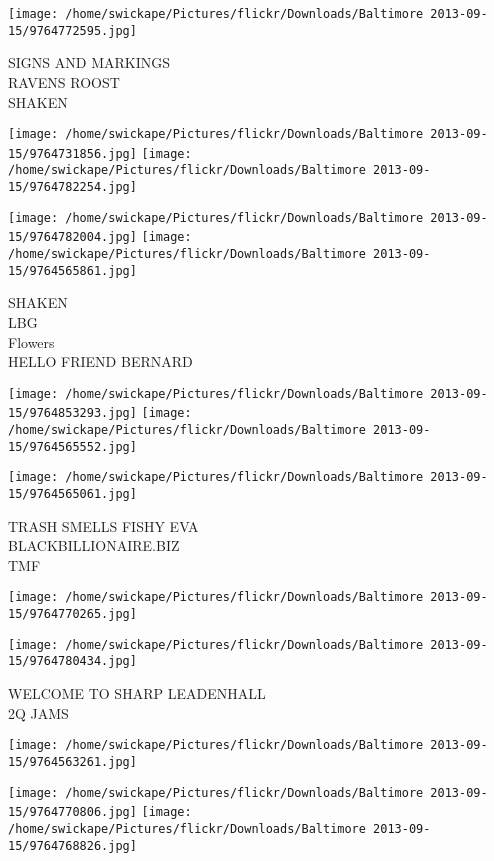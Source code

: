 \documentclass[10pt,letterpaper]{article}
\begin{document}
\vspace{0.25in}
\texttt{[image: /home/swickape/Pictures/flickr/Downloads/Baltimore 2013-09-15/9764772595.jpg]}

SIGNS AND MARKINGS\\
RAVENS ROOST\\
SHAKEN
\pagebreak

\texttt{[image: /home/swickape/Pictures/flickr/Downloads/Baltimore 2013-09-15/9764731856.jpg]}
\texttt{[image: /home/swickape/Pictures/flickr/Downloads/Baltimore 2013-09-15/9764782254.jpg]}

\texttt{[image: /home/swickape/Pictures/flickr/Downloads/Baltimore 2013-09-15/9764782004.jpg]}
\texttt{[image: /home/swickape/Pictures/flickr/Downloads/Baltimore 2013-09-15/9764565861.jpg]}

SHAKEN\\
LBG\\
Flowers\\
HELLO FRIEND BERNARD
\pagebreak

\texttt{[image: /home/swickape/Pictures/flickr/Downloads/Baltimore 2013-09-15/9764853293.jpg]}
\texttt{[image: /home/swickape/Pictures/flickr/Downloads/Baltimore 2013-09-15/9764565552.jpg]}

\texttt{[image: /home/swickape/Pictures/flickr/Downloads/Baltimore 2013-09-15/9764565061.jpg]}

TRASH SMELLS FISHY EVA\\
BLACKBILLIONAIRE.BIZ\\
TMF
\pagebreak

\texttt{[image: /home/swickape/Pictures/flickr/Downloads/Baltimore 2013-09-15/9764770265.jpg]}

\vspace{0.25in}
\texttt{[image: /home/swickape/Pictures/flickr/Downloads/Baltimore 2013-09-15/9764780434.jpg]}

WELCOME TO SHARP LEADENHALL\\
2Q JAMS
\pagebreak

\texttt{[image: /home/swickape/Pictures/flickr/Downloads/Baltimore 2013-09-15/9764563261.jpg]}

\vspace{0.25in}
\texttt{[image: /home/swickape/Pictures/flickr/Downloads/Baltimore 2013-09-15/9764770806.jpg]}
\texttt{[image: /home/swickape/Pictures/flickr/Downloads/Baltimore 2013-09-15/9764768826.jpg]}
\end{document}
